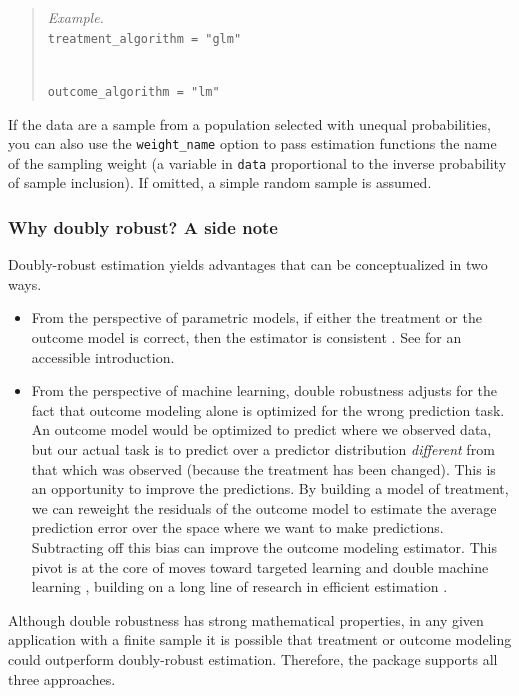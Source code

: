 \documentclass[
]{article}
\providecommand{\tightlist}{%
  \setlength{\itemsep}{0pt}\setlength{\parskip}{0pt}}
\begin{document}
\begin{quote}
\emph{Example.}\\
\texttt{treatment\_algorithm\ =\ "glm"}\strut \\
\texttt{outcome\_algorithm\ =\ "lm"}
\end{quote}

If the data are a sample from a population selected with unequal probabilities, you can also use the \texttt{weight\_name} option to pass estimation functions the name of the sampling weight (a variable in \texttt{data} proportional to the inverse probability of sample inclusion). If omitted, a simple random sample is assumed.

\hypertarget{why-doubly-robust-a-side-note}{%
\subsubsection{Why doubly robust? A side note}\label{why-doubly-robust-a-side-note}}

Doubly-robust estimation yields advantages that can be conceptualized in two ways.

\begin{itemize}
\tightlist
\item
  From the perspective of parametric models, if either the treatment or the outcome model is correct, then the estimator is consistent \citep{bang2005}. See \citet{glynn2010} for an accessible introduction.\\
\item
  From the perspective of machine learning, double robustness adjusts for the fact that outcome modeling alone is optimized for the wrong prediction task. An outcome model would be optimized to predict where we observed data, but our actual task is to predict over a predictor distribution \emph{different} from that which was observed (because the treatment has been changed). This is an opportunity to improve the predictions. By building a model of treatment, we can reweight the residuals of the outcome model to estimate the average prediction error over the space where we want to make predictions. Subtracting off this bias can improve the outcome modeling estimator. This pivot is at the core of moves toward targeted learning \citep{vanderlaan2011} and double machine learning \citep{chernozhukov2018}, building on a long line of research in efficient estimation \citep{robins1995, hahn1998}.
\end{itemize}

Although double robustness has strong mathematical properties, in any given application with a finite sample it is possible that treatment or outcome modeling could outperform doubly-robust estimation. Therefore, the package supports all three approaches.
\end{document}
